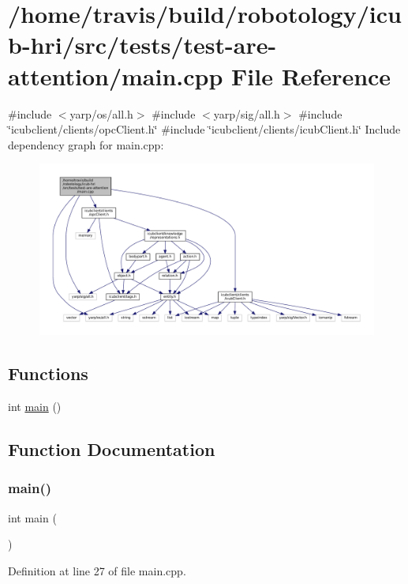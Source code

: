 \hypertarget{tests_2test-are-attention_2main_8cpp}{}\section{/home/travis/build/robotology/icub-\/hri/src/tests/test-\/are-\/attention/main.cpp File Reference}
\label{tests_2test-are-attention_2main_8cpp}
{\ttfamily \#include $<$yarp/os/all.\+h$>$}\newline
{\ttfamily \#include $<$yarp/sig/all.\+h$>$}\newline
{\ttfamily \#include \char`\"{}icubclient/clients/opc\+Client.\+h\char`\"{}}\newline
{\ttfamily \#include \char`\"{}icubclient/clients/icub\+Client.\+h\char`\"{}}\newline
Include dependency graph for main.\+cpp\+:
\nopagebreak
\begin{figure}[H]
\begin{center}
\leavevmode
\includegraphics[width=350pt]{tests_2test-are-attention_2main_8cpp__incl}
\end{center}
\end{figure}
\subsection*{Functions}
\begin{DoxyCompactItemize}
\item 
int \hyperlink{tests_2test-are-attention_2main_8cpp_ae66f6b31b5ad750f1fe042a706a4e3d4}{main} ()
\end{DoxyCompactItemize}


\subsection{Function Documentation}
\mbox{\label{tests_2test-are-attention_2main_8cpp_ae66f6b31b5ad750f1fe042a706a4e3d4}} 
\subsubsection{\texorpdfstring{main()}{main()}}
{\footnotesize\ttfamily int main (\begin{DoxyParamCaption}{ }\end{DoxyParamCaption})}



Definition at line 27 of file main.\+cpp.

